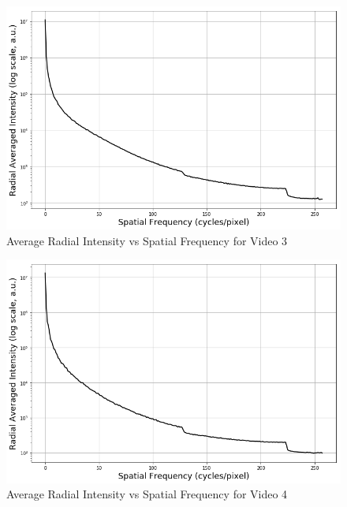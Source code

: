 \documentclass{ioereport}
\begin{document}
\begin{figure}[H]
    \centering
    \includegraphics[width=\linewidth]{assets/video_radial_plots/short.png}
    \caption{Average Radial Intensity vs Spatial Frequency for Video 3}
    \label{fig:radial-plot-3}
\end{figure}

\begin{figure}[H]
    \centering
    \includegraphics[width=\linewidth]{assets/video_radial_plots/medium.png}
    \caption{Average Radial Intensity vs Spatial Frequency for Video 4}
    \label{fig:radial-plot-4}
\end{figure}
\end{document}
